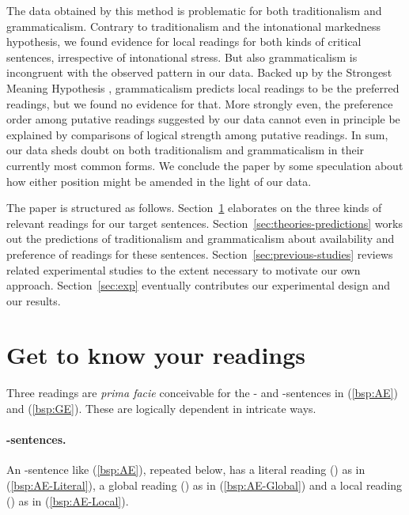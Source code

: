 \documentclass[fleqn,reqno,10pt,draft]{article}
\newcommand{\lit}{\acro{lit}}
\newcommand{\glb}{\acro{glb}}
\newcommand{\loc}{\acro{loc}}
\newcommand{\as}{\acro{as}}
\renewcommand{\es}{\acro{es}}
\begin{document}
The data obtained by this method is problematic for both
traditionalism and grammaticalism. Contrary to traditionalism and the
intonational markedness hypothesis, we found evidence for local
readings for both kinds of critical sentences, irrespective of
intonational stress.  But also grammaticalism is
incongruent with the observed pattern in our data. Backed up by the
Strongest Meaning Hypothesis
\citep{DalrympleKanazawa1998:Reciprocal-Expr}, grammaticalism predicts
local readings to be the preferred readings, but we found no evidence
for that. More strongly even, the preference order among putative
readings suggested by our data cannot even in principle be explained
by comparisons of logical strength among putative readings. In sum,
our data sheds doubt on both traditionalism and grammaticalism in
their currently most common forms. We conclude the paper by some
speculation about how either position might be amended in the light of
our data.

The paper is structured as follows. Section~\ref{sec:get-know-your}
elaborates on the three kinds of relevant readings for our target
sentences. Section~\ref{sec:theories-predictions} works out the
predictions of traditionalism and grammaticalism about availability
and preference of readings for these
sentences. Section~\ref{sec:previous-studies} reviews related
experimental studies to the extent necessary to motivate our own
approach. Section~\ref{sec:exp} eventually contributes our
experimental design and our results.

\section{Get to know your readings}
\label{sec:get-know-your}

Three readings are \emph{prima facie} conceivable for the \as- and
\es-sentences in (\ref{bsp:AE}) and (\ref{bsp:GE}). These are
logically dependent in intricate ways.

\paragraph{\as-sentences.}

An \as-sentence like (\ref{bsp:AE}), repeated below, has a literal
reading (\lit) as in (\ref{bsp:AE-Literal}), a global reading (\glb) as in
(\ref{bsp:AE-Global}) and a local reading (\loc) as in (\ref{bsp:AE-Local}).
\end{document}
